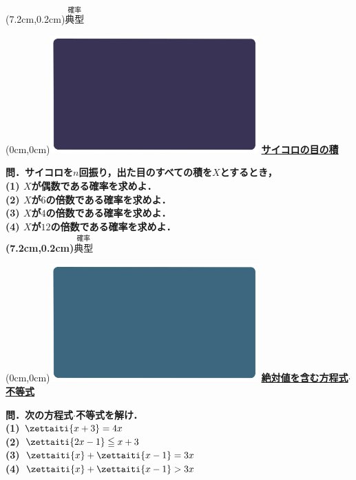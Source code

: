\documentclass[10pt,
fleqn,
dvipdfmx,
uplatex
]{jsarticle}
\begin{document}
\at(7.2cm,0.2cm){\small\color{bradorange}$\overset{\text{確率}}{\text{典型}}$}


\newpage



\at(0cm,0cm){\includegraphics[width=8cm,bb=0 0 1920 1080]{./youtube/thumbnails/templates/smart_background/確率.jpeg}}
{\color{orange}\bf\boldmath\huge\underline{サイコロの目の積}}\vspace{0.3zw}

\normalsize 
\bf\boldmath 問．サイコロを$n$回振り，出た目のすべての積を$X$とするとき，\\
(1)  $X$が偶数である確率を求めよ．\\
(2)  $X$が$6$の倍数である確率を求めよ．\\
(3)  $X$が$4$の倍数である確率を求めよ．\\
(4)  $X$が${12}$の倍数である確率を求めよ．\\

\at(7.2cm,0.2cm){\small\color{bradorange}$\overset{\text{確率}}{\text{典型}}$}


\newpage



\at(0cm,0cm){\includegraphics[width=8cm,bb=0 0 1920 1080]{./youtube/thumbnails/templates/smart_background/数I数と式.jpeg}}
{\color{orange}\bf\boldmath\Large\underline{絶対値を含む方程式$\cdot$不等式}}\vspace{0.3zw}

\large 
\bf\boldmath 問．次の方程式$\cdot$不等式を解け．\\
(1)  $\zettaiti{x+3}=4x$\\
(2)  $\zettaiti{2x-1}\leqq x+3$\\
(3)  $\zettaiti{x}+\zettaiti{x-1}=3x$\\
(4)  $\zettaiti{x}+\zettaiti{x-1}>3x$\\
\end{document}
